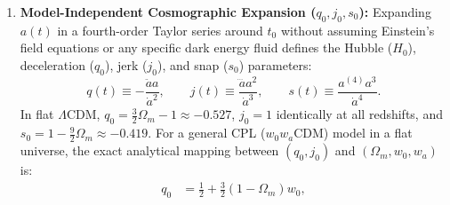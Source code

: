 \documentclass[11pt,letterpaper]{article}
\begin{document}
\begin{enumerate}
    \begin{itemize}
        \setlength{\itemsep}{2pt}
        \item \emph{Calibrated Thawing} ($1\text{ dof}$): $w_a = -1.58(1 + w_0)$, approximating slow-roll scalar fields thawing from $w = -1$ at early times.
        \item \emph{Algebraic Thawing} ($2\text{ dof}$, strictly enforcing $w(a) \ge -1$ at all redshifts):
        \begin{equation}
            1 + w(a) = (1 + w_0)\, a^p \left( \frac{1 + b}{1 + b a^{-3}} \right)^{1 - p/3}, \qquad b = 0.5, \quad w_0 \in [-1, 1], \quad p \in [0, 30].
            \label{eq:alg_thawing}
        \end{equation}
        \item \emph{Generalized Emergent Dark Energy ($1\text{ dof}$):} $f_{\rm DE}(z) = [1 - \tanh(\Delta \log_{10}((1+z)/(1+z_t)))] /$
        $[1 + \tanh(\Delta \log_{10}(1+z_t))]$, where dark energy emerges rapidly at late times with $\Delta=0$ recovering $\Lambda$CDM.
        \item \emph{Mirage Dark Energy} ($1\text{ dof}$): $w_a = -3.66(1 + w_0)$, which fixes the comoving distance to last scattering $D_M(z_*)$ to match a $\Lambda$CDM universe across variations of $w_0$, aligning with the principal eigenvector of the DESI+CMB+SNe contour in the $(w_0, w_a)$ plane.
    \end{itemize}
    \item \textbf{Model-Independent Cosmographic Expansion ($q_0, j_0, s_0$):} Expanding $a(t)$ in a fourth-order Taylor series around $t_0$ without assuming Einstein's field equations or any specific dark energy fluid defines the Hubble ($H_0$), deceleration ($q_0$), jerk ($j_0$), and snap ($s_0$) parameters:
    \begin{equation}
        q(t) \equiv -\frac{\ddot{a}a}{\dot{a}^2}, \qquad j(t) \equiv \frac{\dddot{a}a^2}{\dot{a}^3}, \qquad s(t) \equiv \frac{a^{(4)}a^3}{\dot{a}^4}.
        \label{eq:cosmography_defs}
    \end{equation}
    In flat $\Lambda$CDM, $q_0 = \frac{3}{2}\Omega_m - 1 \approx -0.527$, $j_0 = 1$ identically at all redshifts, and $s_0 = 1 - \frac{9}{2}\Omega_m \approx -0.419$. For a general CPL ($w_0 w_a$CDM) model in a flat universe, the exact analytical mapping between $(q_0, j_0)$ and $(\Omega_m, w_0, w_a)$ is:
    \begin{align}
        q_0 &= \frac{1}{2} + \frac{3}{2}(1 - \Omega_m) w_0, \label{eq:q0_cpl} \\

\end{align}
\end{enumerate}
\end{document}
